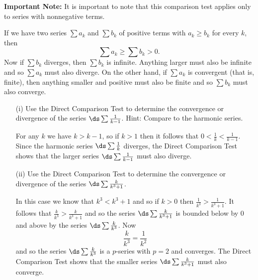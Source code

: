\begin{exercises}
\noindent \textbf{Important Note:} It is important to note that this comparison test applies only to series with nonnegative terms.

\begin{exerciseSolution}
If we have two series $\sum a_k$ and $\sum b_k$ of positive terms with $a_k \geq b_k$ for every $k$, then
\[\sum a_k \geq \sum b_k > 0.\]
Now if $\sum b_k$ diverges, then $\sum b_k$ is infinite. Anything larger must also be infinite and so $\sum a_k$ must also diverge. On the other hand, if $\sum a_k$ is convergent (that is, finite), then anything smaller and positive must also be finite and so $\sum b_k$ must also converge. \end{exerciseSolution}

    \begin{itemize}
    \item[(i)] Use the Direct Comparison Test to determine the convergence or divergence of the series $\ds \sum \frac{1}{k-1}$. Hint: Compare to the harmonic series.

\begin{exerciseSolution}
For any $k$ we have $k > k-1$, so if $k > 1$ then it follows that $0 < \frac{1}{k} < \frac{1}{k-1}$. Since the harmonic series $\ds \sum \frac{1}{k}$ diverges, the Direct Comparison Test shows that the larger series $\ds \sum \frac{1}{k-1}$ must also diverge.
\end{exerciseSolution}

    \item[(ii)] Use the Direct Comparison Test to determine the convergence or divergence of the series $\ds \sum \frac{k}{k^3+1}$.

\begin{exerciseSolution}
In this case we know that $k^3 < k^3+1$ and so if $k > 0$ then $\frac{1}{k^3} > \frac{1}{k^3+1}$. It follows that $\frac{k}{k^3} > \frac{k}{k^3+1}$ and so the series $\ds \sum \frac{k}{k^3+1}$ is bounded below by 0 and above by the series $\ds \sum \frac{k}{k^3}$. Now
\[\frac{k}{k^3} = \frac{1}{k^2}\]
and so the series $\ds \sum \frac{k}{k^3}$ is a $p$-series with $p=2$ and converges. The Direct Comparison Test shows that the smaller series $\ds \sum \frac{k}{k^3+1}$ must also converge.
\end{exerciseSolution}

    \end{itemize}

    \ea



\end{exercises}


\afterexercises

